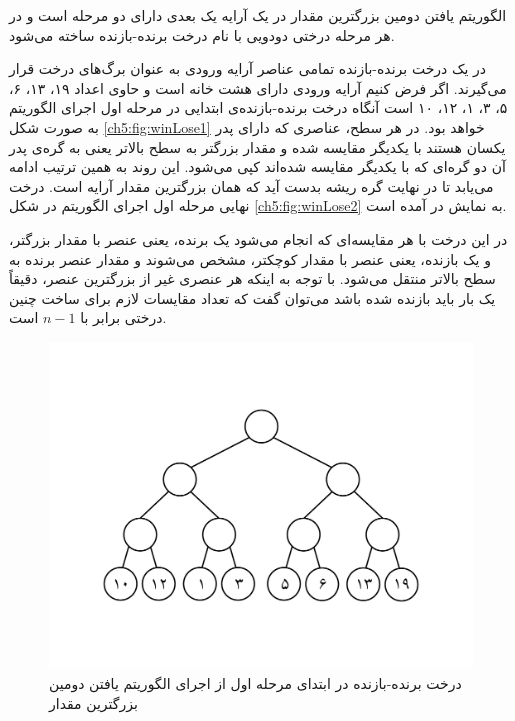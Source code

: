 
الگوریتم یافتن دومین بزرگترین مقدار در یک آرایه یک بعدی دارای دو مرحله است و در هر مرحله درختی دودویی با نام درخت برنده-بازنده ساخته می‌شود.

در یک درخت برنده-بازنده تمامی عناصر آرایه ورودی به عنوان برگ‌های درخت قرار می‌گیرند. اگر فرض کنیم آرایه ورودی دارای هشت خانه است و حاوی اعداد ۱۹، ۱۳، ۶، ۵، ۳، ۱، ۱۲، ۱۰ است آنگاه درخت برنده-بازنده‌ی ابتدایی در مرحله اول اجرای الگوریتم به صورت شکل {\eqref{ch5:fig:winLose1}} خواهد بود. در هر سطح، عناصری که دارای پدر یکسان هستند با یکدیگر مقایسه شده و مقدار بزرگتر به سطح بالاتر یعنی به گره‌ی پدر آن دو گره‌ای که با یکدیگر مقایسه شده‌اند کپی می‌شود. این روند به همین ترتیب ادامه می‌یابد تا در نهایت گره ریشه بدست آید که همان بزرگترین مقدار آرایه است. درخت نهایی مرحله اول اجرای الگوریتم در شکل {\eqref{ch5:fig:winLose2}} به نمایش در آمده است. 

در این درخت با هر مقایسه‌ای که انجام می‌شود یک برنده، یعنی عنصر با مقدار بزرگتر، و یک بازنده، یعنی عنصر با مقدار کوچکتر، مشخص می‌شوند و مقدار عنصر برنده به سطح بالاتر منتقل می‌شود. با توجه به اینکه هر عنصری غیر از بزرگترین عنصر، دقیقاً یک بار باید بازنده شده‌ باشد می‌توان گفت که تعداد مقایسات لازم برای ساخت چنین درختی برابر با {$n-1$} است. 

\begin{figure}
\begin{center}
\includegraphics[scale=0.36]{figs/ch5/winner_loser_tree_1.pdf}
\caption{درخت برنده-بازنده در ابتدای مرحله اول از اجرای الگوریتم یافتن دومین بزرگترین مقدار}\label{ch5:fig:winLose1}
\end{center}
\end{figure}

